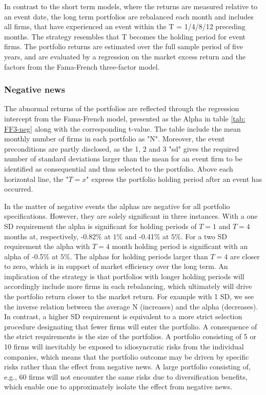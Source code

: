 In contrast to the short term models, where the returns are measured relative to an event date, the long term portfolios are rebalanced each month and includes all firms, that have experienced an event within the T = 1/4/8/12 preceding months. The strategy resembles that T becomes the holding period for event firms. The portfolio returns are estimated over the full sample period of five years, and are evaluated by a regression on the market excess return and the factors from the Fama-French \citeyear{Fama_french_3fac} three-factor model. 

\subsubsection{Negative news}

The abnormal returns of the portfolios are reflected through the regression intercept from the Fama-French model, presented as the Alpha in table \ref{tab: FF3-neg} along with the corresponding t-value. The table include the mean monthly number of firms in each portfolio as "N". Moreover, the event preconditions are partly disclosed, as the 1, 2 and 3 "sd" gives the required number of standard deviations larger than the mean for an event firm to be identified as consequential and thus selected to the portfolio. Above each horizontal line, the "$T = x$" express the portfolio holding period after an event has occurred. 

In the matter of negative events the alphas are negative for all portfolio specifications. However, they are solely significant in three instances. With a one SD requirement the alpha is significant for holding periods of $T = 1$ and $T = 4$ months at, respectively, -0.82\% at $1\%$ and -0.41\% at $5\%$. For a two SD requirement the alpha with $T=4$ month holding period is significant with an alpha of -0.5\% at $5\%$. The alphas for holding periods larger than $T = 4$ are closer to zero, which is in support of market efficiency over the long term. An implication of the strategy is that portfolios with longer holding periods will accordingly include more firms in each rebalancing, which ultimately will drive the portfolio return closer to the market return. For example with 1 SD, we see the inverse relation between the average N (increases) and the alpha (decreases). In contrast, a higher SD requirement is equivalent to a more strict selection procedure designating that fewer firms will enter the portfolio. A consequence of the strict requirements is the size of the portfolios. A portfolio consisting of 5 or 10 firms will inevitably be exposed to idiosyncratic risks from the individual companies, which means that the portfolio outcome may be driven by specific risks rather than the effect from negative news. A large portfolio consisting of, e.g., 60 firms will not encounter the same risks due to diversification benefits, which enable one to approximately isolate the effect from negative news. 

